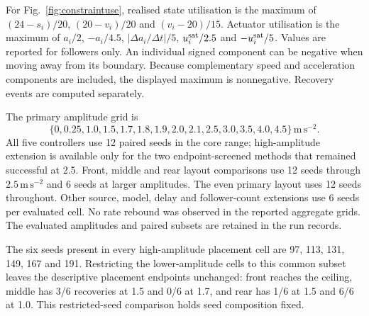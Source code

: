 \documentclass[11pt]{article}
\begin{document}
For Fig.~\ref{fig:constraintuse}, realised state utilisation is the maximum of $(24-s_i)/20$, $(20-v_i)/20$ and $(v_i-20)/15$. Actuator utilisation is the maximum of $a_i/2$, $-a_i/4.5$, $|\Delta a_i/\Delta t|/5$, $u_i^{\rm sat}/2.5$ and $-u_i^{\rm sat}/5$. Values are reported for followers only. An individual signed component can be negative when moving away from its boundary. Because complementary speed and acceleration components are included, the displayed maximum is nonnegative. Recovery events are computed separately.

The primary amplitude grid is
\[
\{0,0.25,1.0,1.5,1.7,1.8,1.9,2.0,2.1,2.5,3.0,3.5,4.0,4.5\}\,\mathrm{m\,s^{-2}}.
\]
All five controllers use 12 paired seeds in the core range; high-amplitude extension is available only for the two endpoint-screened methods that remained successful at 2.5. Front, middle and rear layout comparisons use 12 seeds through $2.5\,\mathrm{m\,s^{-2}}$ and 6 seeds at larger amplitudes. The even primary layout uses 12 seeds throughout. Other source, model, delay and follower-count extensions use 6 seeds per evaluated cell. No rate rebound was observed in the reported aggregate grids. The evaluated amplitudes and paired subsets are retained in the run records.

The six seeds present in every high-amplitude placement cell are 97, 113, 131, 149, 167 and 191. Restricting the lower-amplitude cells to this common subset leaves the descriptive placement endpoints unchanged: front reaches the ceiling, middle has 3/6 recoveries at 1.5 and 0/6 at 1.7, and rear has 1/6 at 1.5 and 6/6 at 1.0. This restricted-seed comparison holds seed composition fixed.
\end{document}
